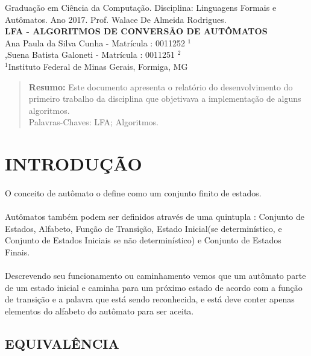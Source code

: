 \documentclass[a4paper,portuguese,12pt]{article}
\begin{document}
\begin{center}
{\footnotesize Graduação em Ciência da Computação. Disciplina: Linguagens Formais e Autômatos. Ano 2017. Prof. Walace De Almeida Rodrigues.}\\[0.5cm]
{\Large \textbf {LFA - ALGORITMOS DE CONVERSÃO DE AUTÔMATOS}}\\[0.5cm]
Ana Paula da Silva Cunha - Matrícula :  0011252		$^1$\\,Suena Batista Galoneti -  Matrícula :	0011251		$^2$\\
$^1$Instituto Federal de Minas Gerais, Formiga, MG\\[1cm]
\end{center}

\begin{quote}
{\small \textbf{Resumo:} Este documento apresenta o relatório do desenvolvimento do primeiro trabalho da disciplina que objetivava a implementação de alguns algoritmos.} \\[0.5cm]
{\small Palavras-Chaves: LFA; Algoritmos.}
\end{quote}
	
\section{INTRODUÇÃO}

\paragraph{} O conceito de autômato o define como um conjunto finito de estados. 

\paragraph{} Autômatos também podem ser definidos através de uma quintupla : Conjunto de Estados, Alfabeto, Função de Transição, Estado Inicial(se determinístico, e Conjunto de Estados Iniciais se não determinístico) e Conjunto de Estados Finais.

\paragraph{}Descrevendo seu funcionamento ou caminhamento vemos que um autômato parte de um estado inicial e caminha para um próximo estado de acordo com a função de transição e a palavra que está sendo reconhecida, e está deve conter apenas elementos do alfabeto do autômato para ser aceita.

\subsection{EQUIVALÊNCIA}
\end{document}
